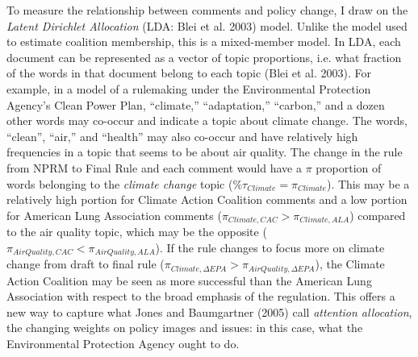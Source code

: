 

To measure the relationship between comments and policy change, I draw on the \textit{Latent Dirichlet Allocation} (LDA: Blei et al. 2003) model. Unlike the model used to estimate coalition membership, this is a mixed-member model. In LDA, each document can be represented as a vector of topic proportions, i.e. what fraction of the words in that document belong to each topic (Blei et al. 2003). For example, in a model of a rulemaking under the Environmental Protection Agency's Clean Power Plan, ``climate,'' ``adaptation,'' ``carbon,'' and a dozen other words may co-occur and indicate a topic about climate change. The words, ``clean'', ``air,'' and ``health'' may also co-occur and have relatively high frequencies in a topic that seems to be about air quality.  The change in the rule from NPRM to Final Rule and each comment would have a $\pi$ proportion of words belonging to the \textit{climate change} topic (\%$\tau_{Climate}=\pi_{Climate}$). This may be a relatively high portion for Climate Action Coalition comments and a low portion for American Lung Association comments ($\pi_{Climate, CAC} > \pi_{Climate, ALA}$) compared to the air quality topic, which may be the opposite ($\pi_{AirQuality, CAC} < \pi_{AirQuality, ALA}$). If the rule changes to focus more on climate change from draft to final rule ($\pi_{Climate, \Delta EPA} > \pi_{AirQuality, \Delta EPA}$), the Climate Action Coalition may be seen as more successful than the American Lung Association with respect to the broad emphasis of the regulation. This offers a new way to capture what Jones and Baumgartner (2005) call \textit{attention allocation}, the changing weights on policy images and issues: in this case, what the Environmental Protection Agency ought to do.

